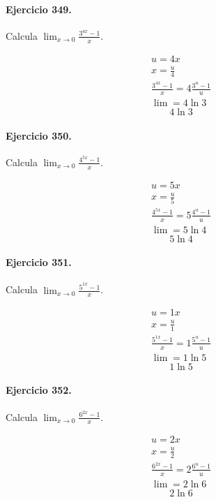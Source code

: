 \documentclass[11pt,a4paper]{article}
\begin{document}
\paragraph{Ejercicio 349.} Calcula $\displaystyle\lim_{x\to0}\frac{3^{4x}-1}{x}$.

\[
\begin{aligned}
u=4x\\
x=\frac{u}{4}\\
\frac{3^{4x}-1}{x}=4\frac{3^u-1}{u}\\
\lim=4\ln 3
\end{aligned}
\]
\[\boxed{4\ln 3}\]


\paragraph{Ejercicio 350.} Calcula $\displaystyle\lim_{x\to0}\frac{4^{5x}-1}{x}$.

\[
\begin{aligned}
u=5x\\
x=\frac{u}{5}\\
\frac{4^{5x}-1}{x}=5\frac{4^u-1}{u}\\
\lim=5\ln 4
\end{aligned}
\]
\[\boxed{5\ln 4}\]


\paragraph{Ejercicio 351.} Calcula $\displaystyle\lim_{x\to0}\frac{5^{1x}-1}{x}$.

\[
\begin{aligned}
u=1x\\
x=\frac{u}{1}\\
\frac{5^{1x}-1}{x}=1\frac{5^u-1}{u}\\
\lim=1\ln 5
\end{aligned}
\]
\[\boxed{1\ln 5}\]


\paragraph{Ejercicio 352.} Calcula $\displaystyle\lim_{x\to0}\frac{6^{2x}-1}{x}$.

\[
\begin{aligned}
u=2x\\
x=\frac{u}{2}\\
\frac{6^{2x}-1}{x}=2\frac{6^u-1}{u}\\
\lim=2\ln 6
\end{aligned}
\]
\[\boxed{2\ln 6}\]
\end{document}
